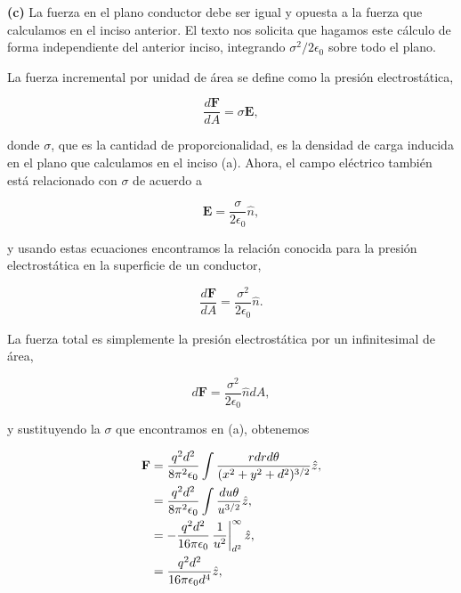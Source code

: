\documentclass[a4paper,10pt]{article}
\numberwithin{equation}{section}
\newcommand{\zerodel}{.\kern-\nulldelimiterspace}
\begin{document}
\textbf{(c)} La fuerza en el plano conductor debe ser igual y opuesta a la fuerza 
que calculamos en el inciso anterior. El texto nos solicita que hagamos este cálculo 
de forma independiente del anterior inciso, integrando $\sigma^2/2\epsilon_0$ sobre 
todo el plano. 

\vspace{.3cm}

La fuerza incremental por unidad de área se define como la presión electrostática, 

\begin{equation}
 \frac{d\mathbf{F}}{dA} = \sigma\mathbf{E},
\end{equation}

donde $\sigma$, que es la cantidad de proporcionalidad, es la densidad de carga 
inducida en el plano que calculamos en el inciso (a). Ahora, el campo eléctrico 
también está relacionado con $\sigma$ de acuerdo a 

\begin{equation}
 \mathbf{E} = \frac{\sigma}{2\epsilon_0}\hat{n},
\end{equation}

y usando estas ecuaciones encontramos la relación conocida para la presión electrostática 
en la superficie de un conductor, 

\begin{equation}
  \frac{d\mathbf{F}}{dA} = \frac{\sigma^2}{2\epsilon_0}\hat{n}.
\end{equation}

La fuerza total es simplemente la presión electrostática por un infinitesimal de 
área, 

\begin{equation}
 d\mathbf{F} = \frac{\sigma^2}{2\epsilon_0}\hat{n}dA,
\end{equation}

y sustituyendo la $\sigma$ que encontramos en (a), obtenemos 

\begin{align*}
 \mathbf{F} &= \frac{q^2d^2}{8\pi^2\epsilon_0}\int 
 \frac{rdrd\theta}{(x^2+y^2+d^2)^{3/2}} \hat{z}, \\
%
  &= \frac{q^2d^2}{8\pi^2\epsilon_0}\int 
 \frac{du\theta}{u^{3/2}}\hat{z}, \\
 &= - \frac{q^2d^2}{16\pi\epsilon_0}\left\zerodel\frac{1}{u^2}\right|_{d^2}^\infty\hat{z}, \\
 &= \frac{q^2d^2}{16\pi\epsilon_0d^4}\hat{z},
\end{align*}
\end{document}
